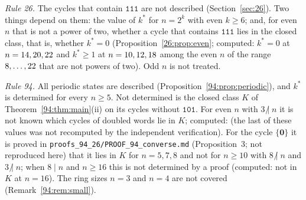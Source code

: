 \documentclass[10pt,a4paper]{article}
\newcommand{\zero}{\mathbf{0}}                %
\newcommand{\kst}{k^{*}}
\newcommand{\code}[1]{\mathtt{#1}}            %
\newcommand{\ndiv}{\mathrel{\not|}}           %
\begin{document}
\emph{Rule 26.}
The cycles that contain $\code{111}$ are not described (Section~\ref{sec:26}). Two things depend on
them: the value of $\kst$ for $n=2^k$ with even $k\ge6$; and, for even $n$ that is not a power of two, whether a cycle
that contains $\code{111}$ lies in the closed class, that is, whether $\kst=0$
(Proposition~\ref{26:prop:even}; computed: $\kst=0$ at $n=14, 20, 22$ and $\kst\ge1$ at
$n=10, 12, 18$ among the even $n$ of the range $8,\dots,22$ that are not powers of two). Odd $n$ is not treated.

\emph{Rule 94.}
All periodic states are described (Proposition~\ref{94:prop:periodic}), and $\kst$ is determined for every $n\ge5$.
Not determined is the closed class $K$ of Theorem~\ref{94:thm:main}(ii) on its cycles without $\code{101}$. For
even $n$ with $3\ndiv n$ it is not known which cycles of doubled words lie in $K$; computed: \NinetyFourDoubledInK{}
(the last of these values was not recomputed by the independent verification). For the cycle $\{\zero\}$ it is
proved in \texttt{proofs\_94\_26/PROOF\_94\_converse.md} (Proposition~3; not reproduced here) that it lies in $K$
for $n=5,7,8$ and not for $n\ge10$ with $8\ndiv n$ and $3\ndiv n$; when $8\mid n$ and $n\ge16$ this is not determined
by a proof (computed: not in $K$ at $n=16$). The ring sizes $n=3$ and $n=4$ are not covered
(Remark~\ref{94:rem:small}).
\end{document}
